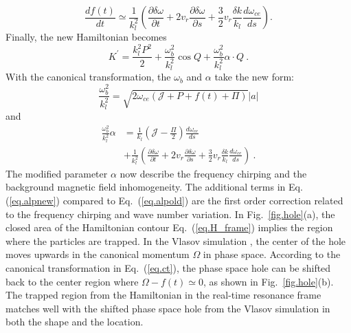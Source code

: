 \begin{equation}
    \frac{d f(t)}{d t} \simeq \frac{1}{k_l^2}(\frac{\partial \delta \omega}{\partial t} + 2 v_r \frac{\partial \delta \omega}{\partial s} + \frac{3}{2}v_r\frac{\delta k}{k_l} \frac{d \omega_{ce}}{d s}  ).
\end{equation}
Finally, the new Hamiltonian becomes 
\begin{equation}\label{eq.H_frame}
    K^\prime = \frac{k_l^2 P^2}{2} + \frac{{\omega^2_{b}}}{k_l^2} \cos Q +\frac{{\omega^2_{b}}}{k_l^2} \alpha \cdot Q~.
\end{equation}
With the canonical  transformation,
the $\omega_{b}$
and  $\alpha$ take the new form: 
\begin{equation}\label{eq.wbnew}
    \frac{{\omega^2_{b}}}{k_l^2} = \sqrt{2\omega_{ce}(\mathcal{J}+P+f(t)+\Pi)}  |a|
\end{equation}
and 
\begin{equation}\label{eq.alpnew}
    \begin{aligned}
    \frac{{\omega^2_{b}}}{k_l^2}\alpha & = \frac{1}{k_l}\left(\mathcal{J} - \frac{\Pi}{2}\right) \frac{d\omega_{ce}}{ds} \\
    & + \frac{1}{k_l^2}\left(\frac{\partial \delta \omega}{\partial t} + 2 v_r \frac{\partial \delta \omega}{\partial s} + \frac{3}{2}v_r\frac{\delta k}{k_l} \frac{d \omega_{ce}}{d s}\right)~.
    \end{aligned}
\end{equation}
The modified parameter $\alpha$ now describe the frequency chirping and the background magnetic field inhomogeneity.
The additional terms in Eq. (\ref{eq.alpnew}) compared to Eq.~(\ref{eq.alpold}) are the first order correction related to the frequency chirping and wave number variation.
In Fig.~\ref{fig.hole}(a),
the closed area of the Hamiltonian contour Eq.~(\ref{eq.H_frame})
implies the region where the particles are trapped. 
In the Vlasov simulation
\cite{zheng2024},
the center of the hole moves upwards in the canonical momentum  
$\Omega$
in phase space.  
According to the canonical transformation in Eq.~(\ref{eq.ct}),  the  phase space hole  can be shifted back to the center region where $\Omega-f(t)\simeq 0$, as shown in Fig.~\ref{fig.hole}(b). 
The trapped region from the Hamiltonian  in the real-time resonance frame  matches well with the shifted phase space hole from the Vlasov simulation in both the shape and the location.

